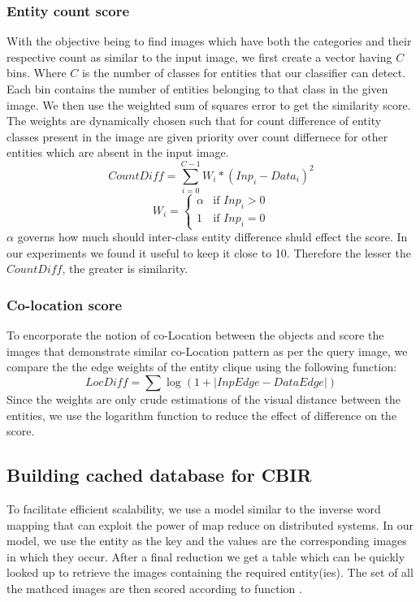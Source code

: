 \documentclass[conference]{IEEEtran}
\begin{document}
{        \subsubsection{Entity count score}
        With the objective being to find images which have both the categories and their respective count  as similar to the input image, we first create a vector having $C$ bins. Where $C$ is the number of classes for entities that our classifier can detect. Each bin contains the number of entities belonging to that class in the given image. We then use the weighted sum of squares error to get the similarity score. The weights are dynamically chosen such that for count difference of entity classes present in the image are given priority over count differnece for other entities which are absent in the input image.\\
            \begin{equation}
            CountDiff =  \sum_{i=0}^{C-1} W_{i}*(Inp_{i} - Data_{i})^{2}
            \end{equation}
            \[
              W_{i} = 
              \begin{cases} 
               \alpha & \text{if } Inp_{i} > 0 \\
               1       & \text{if } Inp_{i} = 0
              \end{cases}
            \]
            $\alpha $ governs how much should inter-class entity difference shuld effect the score. In our experiments we found it useful to keep it close to 10. Therefore the lesser the $CountDiff$, the greater is similarity.
        
    \subsubsection{Co-location score}
    To encorporate the notion of co-Location between the objects and score the images that demonstrate similar co-Location pattern as per the query image, we compare the the edge weights of the entity clique using the following function:
        \begin{equation}
        LocDiff = \sum \log (1 + |InpEdge - DataEdge|)
        \end{equation}
    Since the weights are only crude estimations of the visual distance between the entities, we use the logarithm function to reduce the effect of difference on the score.
    
    \subsection{Building cached database for CBIR}
    To facilitate efficient scalability, we use a model similar to the inverse word mapping \cite{map-reduce-inverted-index} \cite{map-reduce-image} that can exploit the power of map reduce on distributed systems. In our model, we use the entity as the key and the values are the corresponding images in which they occur. After a final reduction we get a table which can be quickly looked up to retrieve the images containing the required entity(ies). The set of all the mathced images are then scored according to function \cite{score}. 

}
\end{document}
